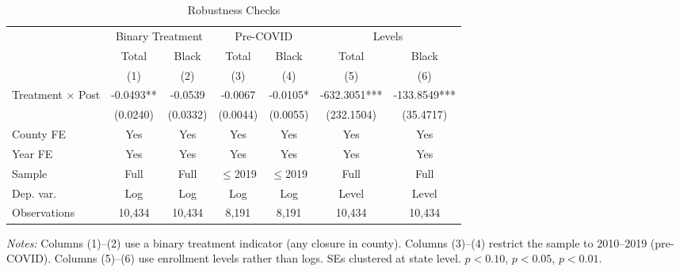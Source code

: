 \begin{table}[htbp]
\centering
\caption{Robustness Checks}
\label{tab:robust}
\begin{adjustbox}{max width=\textwidth}
\begin{threeparttable}
\begin{tabular}{l cc cc cc}
\toprule
 & \multicolumn{2}{c}{Binary Treatment} & \multicolumn{2}{c}{Pre-COVID} & \multicolumn{2}{c}{Levels} \\
\cmidrule(lr){2-3} \cmidrule(lr){4-5} \cmidrule(lr){6-7}
 & Total & Black & Total & Black & Total & Black \\
 & (1) & (2) & (3) & (4) & (5) & (6) \\
\midrule
Treatment $\times$ Post & -0.0493** & -0.0539 & -0.0067 & -0.0105* & -632.3051*** & -133.8549*** \\
 & (0.0240) & (0.0332) & (0.0044) & (0.0055) & (232.1504) & (35.4717) \\
\midrule
County FE & Yes & Yes & Yes & Yes & Yes & Yes \\
Year FE & Yes & Yes & Yes & Yes & Yes & Yes \\
Sample & Full & Full & $\leq$2019 & $\leq$2019 & Full & Full \\
Dep. var. & Log & Log & Log & Log & Level & Level \\
Observations & 10,434 & 10,434 & 8,191 & 8,191 & 10,434 & 10,434 \\
\bottomrule
\end{tabular}
\begin{tablenotes}[flushleft]
\footnotesize
\item \textit{Notes:} Columns (1)--(2) use a binary treatment indicator (any closure in county). Columns (3)--(4) restrict the sample to 2010--2019 (pre-COVID). Columns (5)--(6) use enrollment levels rather than logs. SEs clustered at state level. \sym{*} $p<0.10$, \sym{**} $p<0.05$, \sym{***} $p<0.01$.
\end{tablenotes}
\end{threeparttable}
\end{adjustbox}
\end{table}

